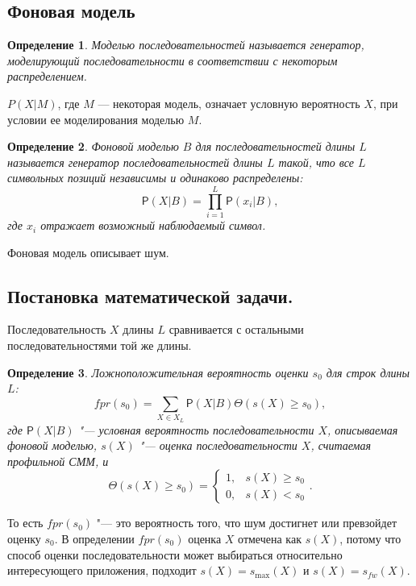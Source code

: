 \documentclass[specialist,
substylefile = spbu_report.rtx,
subf,href,colorlinks=true, 12pt]{disser}
\newtheorem{defenition}{Определение}
\begin{document}
			\subsection{Фоновая модель}
				\begin{defenition}
					Моделью последовательностей называется генератор, моделирующий последовательности в соответствии с некоторым распределением. 
				\end{defenition}
				
				$P(X|M)$, где $M$ --- некоторая модель, означает условную вероятность $X$, при условии ее моделирования моделью $M$.
				
				\begin{defenition}
					Фоновой моделью $B$ для последовательностей длины $L$ называется генератор последовательностей длины $L$ такой, что все $L$ символьных позиций независимы и одинаково распределены:
					\begin{equation}
						\mathsf{P}(X|B) = \prod_{i=1}^{L}\mathsf{P}(x_{i}|B), \label{eq:6}
					\end{equation}
					где $x_i$ отражает возможный наблюдаемый символ.
				\end{defenition}
				
				Фоновая модель описывает шум.
				
			\subsection{Постановка математической задачи.}
				Последовательность $X$ длины $L$ сравнивается с остальными последовательностями той же длины.
				\begin{defenition}
					Ложноположительная вероятность оценки $s_{0}$ для строк длины $L$:	
					\begin{equation}
						fpr(s_{0}) =  \sum_{X \in X_{L}} \mathsf{P}(X|B) \Theta(s(X) \geq s_{0}), 
						\label{eq:7}
					\end{equation}
					где $\mathsf{P}(X|B)$ "--- условная вероятность последовательности $X$, описываемая фоновой моделью, $s(X)$ "--- оценка последовательности $X$, считаемая профильной СММ, и
					\[
					\Theta(s(X) \geq s_{0}) = 
					\begin{cases}
						1, & s(X) \geq s_{0}\\
						0, & s(X) < s_{0}
					\end{cases}.
					\]
				\end{defenition}	
				То есть $fpr(s_{0})$ "--- это вероятность того, что шум достигнет или превзойдет оценку $s_{0}$. В определении $fpr(s_{0})$ оценка $X$ отмечена как $s(X)$, потому что способ оценки последовательности может выбираться относительно интересующего приложения, подходит $s(X) = s_{\max}(X)$ и $s(X) = s_{fw}(X)$.
			
\end{document}
